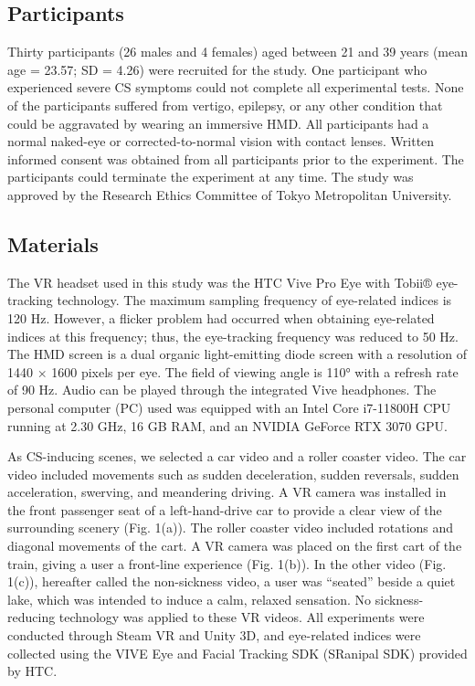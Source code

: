 \documentclass{ieeeaccess}
\begin{document}
\subsection{Participants}
Thirty participants (26 males and 4 females) aged between 21 and 39 years (mean age = 23.57; SD = 4.26) were recruited for the study. One participant who experienced severe CS symptoms could not complete all experimental tests. None of the participants suffered from vertigo, epilepsy, or any other condition that could be aggravated by wearing an immersive HMD. All participants had a normal naked-eye or corrected-to-normal vision with contact lenses. Written informed consent was obtained from all participants prior to the experiment. The participants could terminate the experiment at any time. The study was approved by the Research Ethics Committee of Tokyo Metropolitan University.

\subsection{Materials}
The VR headset used in this study was the HTC Vive Pro Eye with Tobii® eye-tracking technology.
The maximum sampling frequency of eye-related indices is 120 Hz. However, a flicker problem had occurred when obtaining eye-related indices at this frequency; thus, the eye-tracking frequency was reduced to 50 Hz. 
The HMD screen is a dual organic light-emitting diode screen with a resolution of 1440 × 1600 pixels per eye. The field of viewing angle is 110° with a refresh rate of 90 Hz. Audio can be played through the integrated Vive headphones. The personal computer (PC) used was equipped with an Intel Core i7-11800H CPU running at 2.30 GHz, 16 GB RAM, and an NVIDIA GeForce RTX 3070 GPU. 

As CS-inducing scenes, we selected a car video and a roller coaster video. The car video included movements such as sudden deceleration, sudden reversals, sudden acceleration, swerving, and meandering driving. A VR camera was installed in the front passenger seat of a left-hand-drive car to provide a clear view of the surrounding scenery (Fig. 1(a)). The roller coaster video included rotations and diagonal movements of the cart. A VR camera was placed on the first cart of the train, giving a user a front-line experience (Fig. 1(b)). In the other video (Fig. 1(c)), hereafter called the non-sickness video, a user was “seated” beside a quiet lake, which was intended to induce a calm, relaxed sensation. No sickness-reducing technology was applied to these VR videos. All experiments were conducted through Steam VR and Unity 3D, and eye-related indices were collected using the VIVE Eye and Facial Tracking SDK (SRanipal SDK) provided by HTC.
\end{document}
